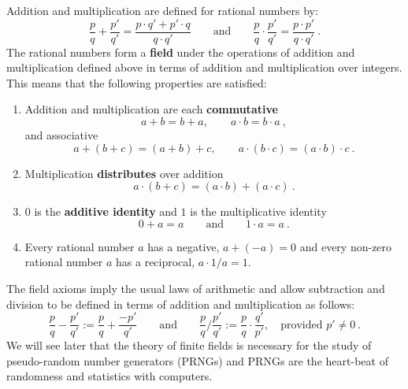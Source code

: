 Addition and multiplication are defined for rational numbers by:
\[
\frac{p}{q} + \frac{p'}{q'} = \frac{p \cdot q' + p' \cdot q}{q \cdot q'}
\qquad \text{and} \qquad \frac{p}{q} \cdot \frac{p'}{q'} = \frac{p \cdot p'}{q \cdot q'} \ .
\]
The rational numbers form a {\bf field} under the operations of addition and multiplication defined above in terms of addition and multiplication over integers.  This means that the following properties are satisfied:
\begin{enumerate}
\item Addition and multiplication are each {\bf commutative}
\[ a+b = b+a, \qquad a \cdot b = b \cdot a \ , \]
and associative
\[
a + (b + c) = (a + b) + c, \qquad a \cdot (b \cdot c) = (a \cdot b) \cdot c \ .
\]
\item Multiplication {\bf distributes} over addition
\[
a \cdot (b+c) = (a \cdot b) + (a \cdot c) \ .
\]
\item $0$ is the {\bf additive identity} and $1$ is the multiplicative identity
\[
0+a=a \qquad \text{and} \qquad 1 \cdot a = a \ .
\]
\item Every rational number $a$ has a negative, $a+(-a)=0$ and every non-zero rational number $a$ has a reciprocal, $a \cdot 1/a = 1$.
\end{enumerate}
The field axioms imply the usual laws of arithmetic and allow subtraction and division to be defined in terms of addition and multiplication as follows:
\[
\frac{p}{q} - \frac{p'}{q'} := \frac{p}{q} + \frac{-p'}{q'}
\qquad \text{and} \qquad  \frac{p}{q} / \frac{p'}{q'} := \frac{p}{q} \cdot \frac{q'}{p'}, \quad \text{provided $p' \neq 0$} \ .
\]
We will see later that the theory of finite fields is necessary for the study of pseudo-random number generators (PRNGs) and PRNGs are the heart-beat of randomness and statistics with computers.


